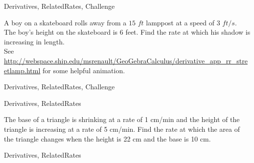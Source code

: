 	
\begin{tagblock}{Derivatives, RelatedRates, Challenge}
\begin{question}
	

A boy on a skateboard rolls away from a $15$ $ft$ lamppost at a speed of $3$ $ft/s$. The boy's height on the skateboard is $6$ feet. Find the rate at which his shadow is increasing in length. \\ See \url{http://webspace.ship.edu/msrenault/GeoGebraCalculus/derivative_app_rr_streetlamp.html}
 for some helpful animation.




	
\begin{tags}
	    Derivatives, RelatedRates, Challenge
\end{tags}
	
\begin{diary}
\end{diary}
	
\begin{solution}
	   
\end{solution}
	
\end{question}

\end{tagblock}



	
\begin{tagblock}{Derivatives, RelatedRates}
\begin{question}
	

The base of a triangle is shrinking at a rate of 1 cm/min and the height of the triangle is increasing at a rate of 5 cm/min. Find the rate at which the area of the triangle changes when the height is 22 cm and the base is 10 cm.



	
\begin{tags}
	    Derivatives, RelatedRates
\end{tags}
	
\begin{diary}
\end{diary}
	
\begin{solution}
	   
\end{solution}
	
\end{question}

\end{tagblock}

